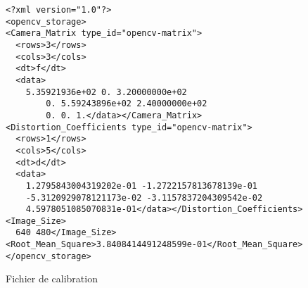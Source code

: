 \documentclass[10pt,a4paper,twoside,twocolumn]{report}
\begin{document}
\begin{code*}[ht!]\centering

	\lstset{language=XML,tabsize=2}
	\begin{lstlisting}
<?xml version="1.0"?>
<opencv_storage>
<Camera_Matrix type_id="opencv-matrix">
  <rows>3</rows>
  <cols>3</cols>
  <dt>f</dt>
  <data>
    5.35921936e+02 0. 3.20000000e+02
		0. 5.59243896e+02 2.40000000e+02
		0. 0. 1.</data></Camera_Matrix>
<Distortion_Coefficients type_id="opencv-matrix">
  <rows>1</rows>
  <cols>5</cols>
  <dt>d</dt>
  <data>
    1.2795843004319202e-01 -1.2722157813678139e-01
    -5.3120929078121173e-02 -3.1157837204309542e-02
    4.5978051085070831e-01</data></Distortion_Coefficients>
<Image_Size>
  640 480</Image_Size>
<Root_Mean_Square>3.8408414491248599e-01</Root_Mean_Square>
</opencv_storage>
	\end{lstlisting}
	\caption{Fichier de calibration}
	\label{code:calibration}
\end{code*}
\end{document}
